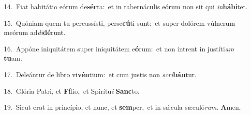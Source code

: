 {\numbfont\textcolor{\numbcolor}{14.}}~Fiat habitátio eórum de\-\textbf{sér}\-ta:~\star et in tabernáculis eórum non sit qui \textit{in}\-\textbf{há}\textbf{bi}tet.\par
{\numbfont\textcolor{\numbcolor}{15.}}~Quóniam quem tu percussísti, perse\-\textbf{cú}\-ti sunt:~\star et super dolórem vúlnerum meórum ad\-\textit{di}\-\textbf{dé}runt.\par
{\numbfont\textcolor{\numbcolor}{16.}}~Appóne iniquitátem super iniquitátem e\-\textbf{ó}\-rum:~\star et non intrent in justíti\textit{am} \textbf{tu}\-am.\par
{\numbfont\textcolor{\numbcolor}{17.}}~Deleántur de libro vi\-\textbf{vén}\-tium:~\star et cum justis non \textit{scri}\-\textbf{bán}tur.\par
{\numbfont\textcolor{\numbcolor}{18.}}~Glória Patri, et \textbf{Fí}\-lio,~\star et Spirítu\textit{i} \textbf{Sanc}\-to.\par
{\numbfont\textcolor{\numbcolor}{19.}}~Sicut erat in princípio, et nunc, et \textbf{sem}\-per,~\star et in sǽcula sæculó\-\textit{rum}\-. \textbf{A}\-men.\par
